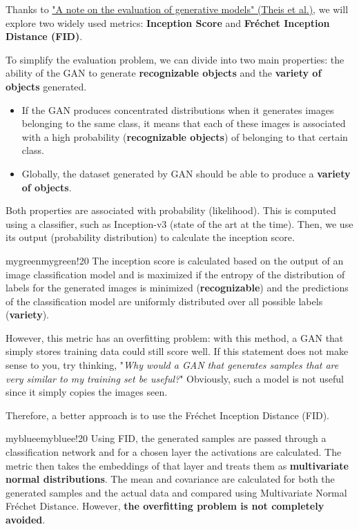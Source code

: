 Thanks to \href{https://arxiv.org/pdf/1511.01844}{"A note on the evaluation of generative models" (Theis et al.)}, we will explore two widely used metrics: \textbf{Inception Score} and \textbf{Fréchet Inception Distance (FID)}.

To simplify the evaluation problem, we can divide into two main properties: the ability of the GAN to generate \textbf{recognizable objects} and the \textbf{variety of objects} generated.
\begin{itemize}
    \item If the GAN produces concentrated distributions when it generates images belonging to the same class, it means that each of these images is associated with a high probability (\textbf{recognizable objects}) of belonging to that certain class.
    \item Globally, the dataset generated by GAN should be able to produce a \textbf{variety of objects}.
\end{itemize}

Both properties are associated with probability (likelihood). This is computed using a classifier, such as Inception-v3 (state of the art at the time). Then, we use its output (probability distribution) to calculate the inception score.

\begin{remark}{mygreen}{mygreen!20}
The inception score is calculated based on the output of an image classification model and is maximized if the entropy of the distribution of labels for the generated images is minimized (\textbf{recognizable}) and the predictions of the classification model are uniformly distributed over all possible labels (\textbf{variety}).
\end{remark}

However, this metric has an overfitting problem: with this method, a GAN that simply stores training data could still score well. If this statement does not make sense to you, try thinking, "\textit{Why would a GAN that generates samples that are very similar to my training set be useful?}" Obviously, such a model is not useful since it simply copies the images seen. 

Therefore, a better approach is to use the Fréchet Inception Distance (FID).

\begin{remark}{mybluee}{mybluee!20}
Using FID, the generated samples are passed through a classification network and for a chosen layer the activations are calculated. The metric then takes the embeddings of that layer and treats them as \textbf{multivariate normal distributions}. The mean and covariance are calculated for both the generated samples and the actual data and compared using Multivariate Normal Fréchet Distance. However, \textbf{the overfitting problem is not completely avoided}.
\end{remark}

